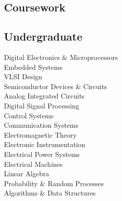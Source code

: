 \documentclass[]{deedy}
\begin{document}
\begin{minipage}[t]{0.25\textwidth} 
\begin{flushleft}
%
\section{Coursework}
\subsection{Undergraduate}
Digital Electronics \& Microprocessors \\
\vspace{1pt}
Embedded Systems \\
\vspace{1pt}
VLSI Design \\
\vspace{1pt}
Semiconductor Devices \& Circuits \\
\vspace{1pt}
Analog Integrated Circuits \\
\vspace{1pt}
Digital Signal Processing \\
\vspace{1pt}
Control Systems \\
\vspace{1pt}
Communication Systems \\
\vspace{1pt}
Electromagnetic Theory \\
\vspace{1pt}
Electronic Instrumentation \\
\vspace{1pt}
Electrical Power Systems \\
\vspace{1pt}
Electrical Machines \\
\vspace{1pt}
Linear Algebra \\
\vspace{1pt}
Probability \& Random Processes \\
\vspace{1pt}
Algorithms \& Data Structures \\
\vspace{1pt}
\sectionsep
%

\end{flushleft}
\end{minipage}
\end{document}
